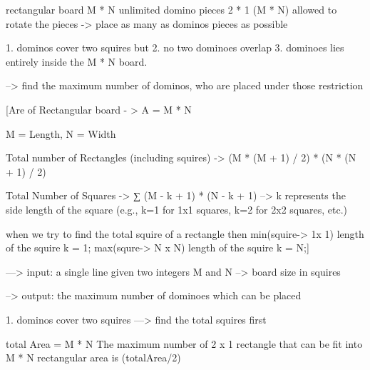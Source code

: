 rectangular board M * N
unlimited domino pieces 2 * 1 (M * N)
allowed to rotate the pieces -> place as many as dominos pieces as possible

1. dominos cover two squires but
2. no two dominoes overlap
3. dominoes lies entirely inside the M * N board.

--> find the maximum number of dominos, who are placed under those restriction

[Are of Rectangular board - > A = M * N

M = Length, N = Width

Total number of Rectangles (including squires) -> (M * (M + 1) / 2) * (N * (N + 1) / 2)

Total Number of Squares -> ∑ (M - k + 1) * (N - k + 1)
--> k represents the side length of the square (e.g., k=1 for 1x1 squares, k=2 for 2x2 squares, etc.)

when we try to find the total squire of a rectangle then
min(squire-> 1x 1) length of the squire k = 1;
max(squre-> N x N) length of the squire k = N;]


--->
input:
a single line given two integers M and N --> board size in squires

-->
output:
the maximum number of dominoes which can be placed

1. dominos cover two squires
---> find the total squires first

total Area = M * N
The maximum number of 2 x 1 rectangle that can be fit into 
M * N rectangular area is (totalArea/2)